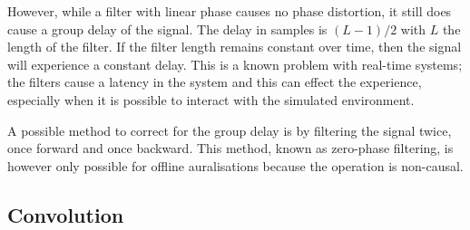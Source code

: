 However, while a filter with linear phase causes no phase distortion, it still 
does cause a group delay of the signal. The delay in samples is $(L-1)/2$ with 
$L$ the length of the filter. If the filter length remains constant over time, 
then the signal will experience a constant delay. This is a known problem with 
real-time systems; the filters cause a latency in the system and this can effect 
the experience, especially when it is possible to interact with the simulated 
environment.

A possible method to correct for the group delay is by filtering the signal 
twice, once forward and once backward. This method, known as zero-phase 
filtering, is however only possible for offline auralisations because the 
operation is non-causal.






\newpage
\subsection{Convolution}

